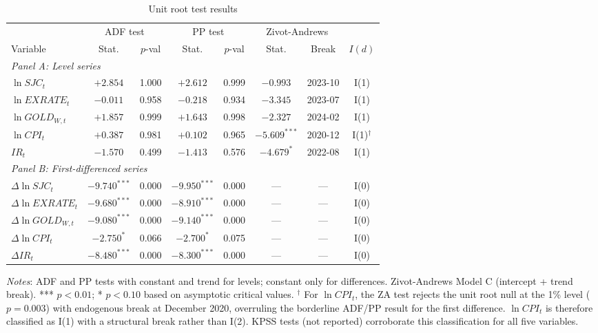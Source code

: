 \documentclass[12pt,a4paper]{article}
\begin{document}
\begin{table}[H]
\caption{Unit root test results}
\label{tab:unitroot}
\centering
\small
\begin{tabular}{lccccccc}
\toprule
& \multicolumn{2}{c}{ADF test} & \multicolumn{2}{c}{PP test}
& \multicolumn{2}{c}{Zivot-Andrews} & \\
\cmidrule(lr){2-3}\cmidrule(lr){4-5}\cmidrule(lr){6-7}
Variable & Stat. & $p$-val & Stat. & $p$-val & Stat. & Break & $I(d)$ \\
\midrule
\multicolumn{8}{l}{\textit{Panel A: Level series}} \\
$\ln SJC_t$ & $+2.854$ & 1.000 & $+2.612$ & 0.999 & $-0.993$ & 2023-10 & I(1) \\
$\ln EXRATE_t$ & $-0.011$ & 0.958 & $-0.218$ & 0.934 & $-3.345$ & 2023-07 & I(1) \\
$\ln GOLD_{W,t}$ & $+1.857$ & 0.999 & $+1.643$ & 0.998 & $-2.327$ & 2024-02 & I(1) \\
$\ln CPI_t$ & $+0.387$ & 0.981 & $+0.102$ & 0.965 & $-5.609^{***}$ & 2020-12 & I(1)$^\dagger$ \\
$IR_t$ & $-1.570$ & 0.499 & $-1.413$ & 0.576 & $-4.679^{*}$ & 2022-08 & I(1) \\
\midrule
\multicolumn{8}{l}{\textit{Panel B: First-differenced series}} \\
$\Delta\ln SJC_t$ & $-9.740^{***}$ & 0.000 & $-9.950^{***}$ & 0.000 & --- & --- & I(0) \\
$\Delta\ln EXRATE_t$ & $-9.680^{***}$ & 0.000 & $-8.910^{***}$ & 0.000 & --- & --- & I(0) \\
$\Delta\ln GOLD_{W,t}$ & $-9.080^{***}$ & 0.000 & $-9.140^{***}$ & 0.000 & --- & --- & I(0) \\
$\Delta\ln CPI_t$ & $-2.750^{*}$ & 0.066 & $-2.700^{*}$ & 0.075 & --- & --- & I(0) \\
$\Delta IR_t$ & $-8.480^{***}$ & 0.000 & $-8.300^{***}$ & 0.000 & --- & --- & I(0) \\
\bottomrule
\end{tabular}
\begin{minipage}{\linewidth}
\vspace{4pt}
\footnotesize
\textit{Notes}: ADF and PP tests with constant and trend for levels;
constant only for differences. Zivot-Andrews Model C (intercept + trend break).
*** $p<0.01$; * $p<0.10$ based on asymptotic critical values.
$^\dagger$ For $\ln CPI_t$, the ZA test rejects the unit root null at
the 1\% level ($p = 0.003$) with endogenous break at December 2020,
overruling the borderline ADF/PP result for the first difference.
$\ln CPI_t$ is therefore classified as I(1) with a structural break
rather than I(2). KPSS tests (not reported) corroborate this
classification for all five variables.
\end{minipage}
\end{table}
\end{document}
